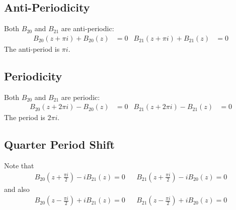 \subsection{Anti-Periodicity}
Both $B_{20}$ and $B_{21}$ are anti-periodic:
\begin{align}
    B_{20}(z + \pi i) + B_{20}(z) &= 0 & B_{21}(z + \pi i) + B_{21}(z) &= 0
\end{align}
The anti-period is $\pi i$.
\subsection{Periodicity}
Both $B_{20}$ and $B_{21}$ are periodic:
\begin{align}
    B_{20}(z + 2\pi i) - B_{20}(z) &= 0 & B_{21}(z + 2\pi i) - B_{21}(z) &= 0
\end{align}
The period is $2\pi i$.
\subsection{Quarter Period Shift}
Note that
\begin{align}
    B_{20}\left(z + \frac{\pi i}{2}\right) - i B_{21}(z) = 0 && B_{21}\left(z + \frac{\pi i}{2}\right) - i B_{20}(z) = 0
\end{align}
and also
\begin{align}
    B_{20}\left(z - \frac{\pi i}{2}\right) + i B_{21}(z) = 0 && B_{21}\left(z - \frac{\pi i}{2}\right) + i B_{20}(z) = 0
\end{align}
